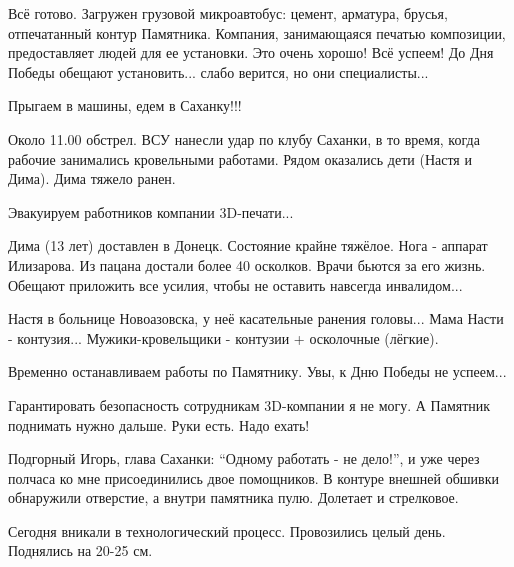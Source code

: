 \begin{multicols}{2}


Всё готово. Загружен грузовой микроавтобус: цемент, арматура, брусья,
отпечатанный контур Памятника. Компания, занимающаяся печатью композиции,
предоставляет людей для ее установки. Это очень хорошо! Всё успеем! До Дня
Победы обещают установить... слабо верится, но они специалисты...

Прыгаем в машины, едем в Саханку!!!



Около 11.00 обстрел. ВСУ нанесли удар по клубу Саханки, в то время, когда
рабочие занимались кровельными работами. Рядом оказались дети (Настя и Дима).
Дима тяжело ранен.

Эвакуируем работников компании 3D-печати...



Дима (13 лет) доставлен в Донецк. Состояние крайне тяжёлое. Нога - аппарат
Илизарова. Из пацана достали более 40 осколков. Врачи бьются за его жизнь.
Обещают приложить все усилия, чтобы не оставить навсегда инвалидом...

Настя в больнице Новоазовска, у неё касательные ранения головы... Мама Насти -
контузия... Мужики-кровельщики - контузии + осколочные (лёгкие).

Временно останавливаем работы по Памятнику. Увы, к Дню Победы не успеем...



Гарантировать безопасность сотрудникам 3D-компании я не могу. А Памятник
поднимать нужно дальше. Руки есть. Надо ехать!

Подгорный Игорь, глава Саханки: \enquote{Одному работать - не дело!}, и уже через
полчаса ко мне присоединились двое помощников. В контуре внешней обшивки
обнаружили отверстие, а внутри памятника пулю. Долетает и стрелковое.

Сегодня вникали в технологический процесс. Провозились целый день. Поднялись на
20-25 см.


\end{multicols}
